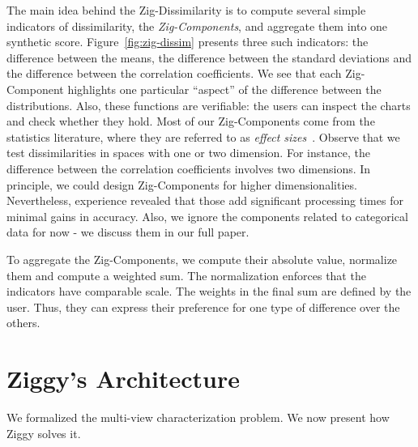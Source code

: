 The main idea behind the Zig-Dissimilarity is to  compute several simple
indicators of dissimilarity, the \emph{Zig-Components}, and aggregate them into
one synthetic score.  Figure~\ref{fig:zig-dissim} presents three such
indicators: the difference between the means, the difference between the
standard deviations and the difference between the correlation coefficients. We
see that each Zig-Component highlights one particular ``aspect'' of the
difference between the distributions.  Also, these functions are verifiable:
the users can inspect the charts and check whether they hold.  Most of our
Zig-Components come from the statistics literature, where they are referred to
as \emph{effect sizes}~\cite{hedges2014statistical}. Observe that we test
dissimilarities in spaces with one or two dimension. For instance, the difference
between the correlation coefficients involves two dimensions. In principle, we
could design Zig-Components for higher dimensionalities.  Nevertheless,
experience revealed that those add significant processing times for minimal
gains in accuracy.  Also, we ignore the components related to categorical data
for now - we discuss them in our full paper.

To aggregate the Zig-Components, we compute their absolute value, normalize
them and compute a weighted sum.  The normalization enforces that the
indicators have comparable scale. The weights in the final sum are defined by
the user. Thus, they can express their preference for one type of difference
over the others. 

\section{Ziggy's Architecture}
\label{sec:solution}


We formalized the multi-view characterization problem. We now present how Ziggy
solves it.

